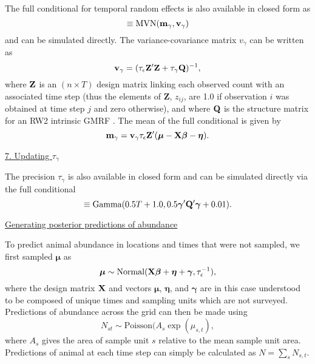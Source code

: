 \documentclass[12pt,fleqn]{article}
\begin{document}
\begin{flushleft}
The full conditional for temporal random effects is also available in closed form as
\begin{equation*}
  [\boldsymbol{\gamma} | \cdot] \equiv \textrm{MVN}({\bf m}_{\gamma},{\bf v}_{\gamma})
\end{equation*}
and can be simulated directly.  The variance-covariance matrix $v_{\gamma}$ can be written as
\begin{equation*}
  {\bf v}_{\gamma} = (\tau_\epsilon {\bf Z}^\prime {\bf Z} + \tau_\gamma{\bf Q})^{-1},
\end{equation*}
where ${\bf Z}$ is an $(n \times T)$ design matrix linking each observed count with an associated time step (thus the elements of {\bf Z}, $z_{ij}$, are 1.0 if observation $i$ was obtained at time step $j$ and zero otherwise), and where ${\bf Q}$ is the structure matrix for an RW2 intrinsic GMRF \citep[see][section 3.4]{RueHeld2005}.  The mean of the full conditional is given by
\begin{equation*}
  {\bf m}_{\gamma} = {\bf v}_\gamma \tau_\epsilon {\bf Z}^\prime (\boldsymbol{\mu}- {\bf X} \boldsymbol{\beta} - \boldsymbol{\eta}).
\end{equation*}

\underline{7. Updating $\tau_\gamma$}

The precision $\tau_\gamma$ is also available in closed form and can be simulated directly via the full conditional
\begin{equation*}
  [\tau_\gamma | \cdot] \equiv \textrm{Gamma}(0.5T + 1.0,0.5 \boldsymbol{\gamma}^\prime {\bf Q}^\prime \boldsymbol{\gamma} + 0.01).
\end{equation*}


\underline{Generating posterior predictions of abundance}

To predict animal abundance in locations and times that were not sampled, we first sampled $\boldsymbol{\mu}$ as
\begin{equation*}
  \boldsymbol{\mu} \sim \textrm{Normal}({\bf X} \boldsymbol{\beta} + \boldsymbol{\eta} + \boldsymbol{\gamma},\tau_\epsilon^{-1}),
\end{equation*}
where the design matrix ${\bf X}$ and vectors $\boldsymbol{\mu}$, $\boldsymbol{\eta}$, and $\boldsymbol{\gamma}$ are in this case understood to be composed of unique times and sampling units which are not surveyed.
Predictions of abundance across the grid can then be made using
\begin{equation*}
  N_{st} \sim \textrm{Poisson}(A_s \exp(\mu_{s,t}),
\end{equation*}
where $A_s$ gives the area of sample unit $s$ relative to the mean sample unit area.  Predictions of animal at
each time step can simply be calculated as $N = \sum_s N_{s,t}$.


\end{flushleft}
\end{document}

